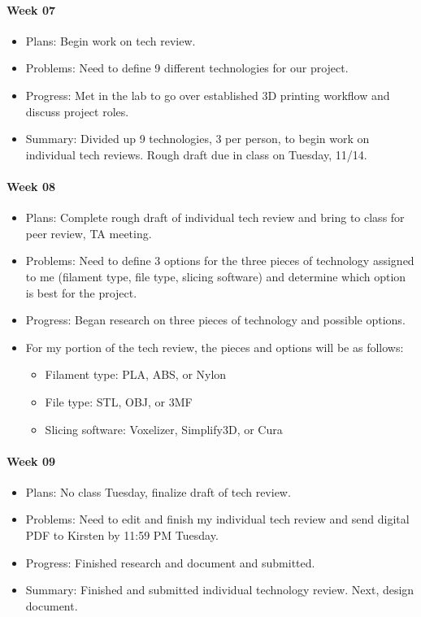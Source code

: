 \paragraph{Week 07}
\begin{itemize}
\item Plans: Begin work on tech review.
\item Problems: Need to define 9 different technologies for our project.
\item Progress: Met in the lab to go over established 3D printing workflow and discuss project roles.
\item Summary: Divided up 9 technologies, 3 per person, to begin work on individual tech reviews. 
Rough draft due in class on Tuesday, 11/14.
\end{itemize}
\paragraph{Week 08}
\begin{itemize}
\item Plans: Complete rough draft of individual tech review and bring to class for peer review, TA meeting.
\item Problems: Need to define 3 options for the three pieces of technology assigned to me (filament type, file type, slicing software) and determine which option is best for the project.
\item Progress: Began research on three pieces of technology and possible options.
\item For my portion of the tech review, the pieces and options will be as follows:
	\begin{itemize}
    \item Filament type: PLA, ABS, or Nylon
	\item File type: STL, OBJ, or 3MF
	\item Slicing software: Voxelizer, Simplify3D, or Cura
    \end{itemize}
\end{itemize}
\paragraph{Week 09}
\begin{itemize}
\item Plans: No class Tuesday, finalize draft of tech review.
\item Problems: Need to edit and finish my individual tech review and send digital PDF to Kirsten by 11:59 PM Tuesday.
\item Progress: Finished research and document and submitted. 
\item Summary: Finished and submitted individual technology review. 
Next, design document.
\end{itemize}

